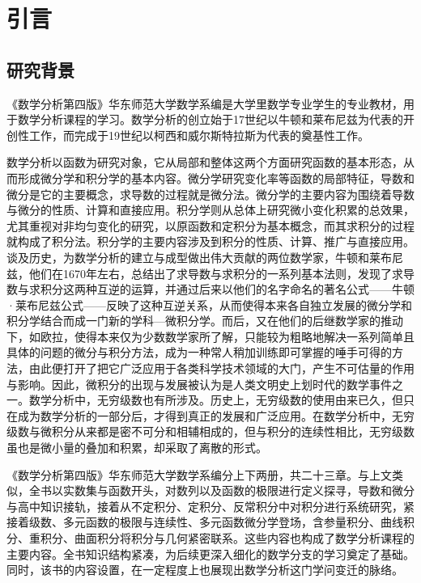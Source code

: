 \chapter{引言}

\section{研究背景}

《数学分析第四版》华东师范大学数学系编是大学里数学专业学生的专业教材，用于数学分析课程的学习。数学分析的创立始于17世纪以牛顿和莱布尼兹为代表的开创性工作，而完成于19世纪以柯西和威尔斯特拉斯为代表的奠基性工作。

数学分析以函数为研究对象，它从局部和整体这两个方面研究函数的基本形态，从而形成微分学和积分学的基本内容。微分学研究变化率等函数的局部特征，导数和微分是它的主要概念，求导数的过程就是微分法。微分学的主要内容为围绕着导数与微分的性质、计算和直接应用。积分学则从总体上研究微小变化积累的总效果，尤其重视对非均匀变化的研究，以原函数和定积分为基本概念，而其求积分的过程就构成了积分法。积分学的主要内容涉及到积分的性质、计算、推广与直接应用。谈及历史，为数学分析的建立与成型做出伟大贡献的两位数学家，牛顿和莱布尼兹，他们在1670年左右，总结出了求导数与求积分的一系列基本法则，发现了求导数与求积分这两种互逆的运算，并通过后来以他们的名字命名的著名公式——牛顿·莱布尼兹公式——反映了这种互逆关系，从而使得本来各自独立发展的微分学和积分学结合而成一门新的学科—微积分学。而后，又在他们的后继数学家的推动下，如欧拉，使得本来仅为少数数学家所了解，只能较为粗略地解决一系列简单且具体的问题的微分与积分方法，成为一种常人稍加训练即可掌握的唾手可得的方法，由此便打开了把它广泛应用于各类科学技术领域的大门，产生不可估量的作用与影响。因此，微积分的出现与发展被认为是人类文明史上划时代的数学事件之一。数学分析中，无穷级数也有所涉及。历史上，无穷级数的使用由来已久，但只在成为数学分析的一部分后，才得到真正的发展和广泛应用。在数学分析中，无穷级数与微积分从来都是密不可分和相辅相成的，但与积分的连续性相比，无穷级数虽也是微小量的叠加和积累，却采取了离散的形式。

《数学分析第四版》华东师范大学数学系编分上下两册，共二十三章。与上文类似，全书以实数集与函数开头，对数列以及函数的极限进行定义探寻，导数和微分与高中知识接轨，接着从不定积分、定积分、反常积分中对积分进行系统研究，紧接着级数、多元函数的极限与连续性、多元函数微分学登场，含参量积分、曲线积分、重积分、曲面积分将积分与几何紧密联系。这些内容也构成了数学分析课程的主要内容。全书知识结构紧凑，为后续更深入细化的数学分支的学习奠定了基础。同时，该书的内容设置，在一定程度上也展现出数学分析这门学问变迁的脉络。



